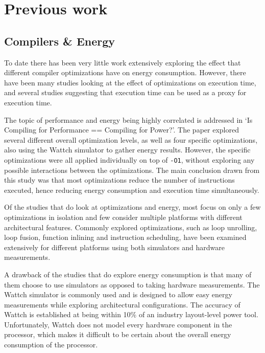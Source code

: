 \documentclass[twocolumn]{article}
\begin{document}
\section{Previous work}

\subsection{Compilers \& Energy}

To date there has been very little work extensively exploring the effect that different compiler optimizations have on energy consumption. However, there have been many studies looking at the effect of optimizations on execution time\cite{Haneda2005}, and several studies suggesting that execution time can be used as a proxy for execution time\cite{CompilingForPerformancePower}.

The topic of performance and energy being highly correlated is addressed in `Is Compiling for Performance == Compiling for Power?'\cite{CompilingForPerformancePower}. The paper explored several different overall optimization levels, as well as four specific optimizations, also using the Wattch simulator to gather energy results. However, the specific optimizations were all applied individually on top of \texttt{-O1}, without exploring any possible interactions between the optimizations. The main conclusion drawn from this study was that most optimizations reduce the number of instructions executed, hence reducing energy consumption and execution time simultaneously.

Of the studies that do look at optimizations and energy, most focus on only a few optimizations in isolation and few consider multiple platforms with different architectural features. Commonly explored optimizations, such as loop unrolling\cite{Ayala2004}, loop fusion\cite{Zhu2004}, function inlining\cite{Kim2012} and instruction scheduling\cite{Toburen1998}, have been examined extensively for different platforms using both simulators and hardware measurements\cite{EffectOfCompilerOptimizationsOnPentium4}.

A drawback of the studies that do explore energy consumption is that many of them choose to use simulators as opposed to taking hardware measurements. The Wattch simulator\cite{Wattch} is commonly used and is designed to allow easy energy measurements while exploring architectural configurations. The accuracy of Wattch is established at being within 10\% of an industry layout-level power tool. Unfortunately, Wattch does not model every hardware component in the processor, which makes it difficult to be certain about the overall energy consumption of the processor.
\end{document}
